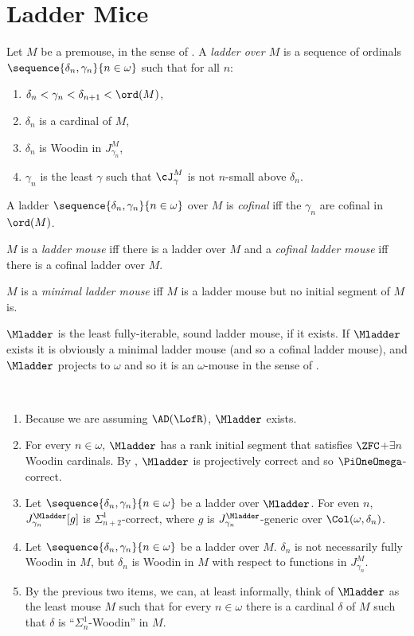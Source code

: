 \documentclass[oneside,12pt]{amsart}
\begin{document}
\section{Ladder Mice}
\label{section:laddermice}
\begin{definition}
Let $M$ be a premouse, in the sense of \cite{FSIT}. A \emph{ladder over $M$}
is a sequence of ordinals $\sequence{\delta_n,\gamma_n}{n\in\omega}$ such that
for all $n$:
\begin{enumerate}
\item $\delta_n < \gamma_n < \delta_{n+1} < \ord(M)$,
\item $\delta_n$ is a cardinal of $M$,
\item $\delta_n$ is Woodin in $J^M_{\gamma_n}$,
\item $\gamma_n$ is the least $\gamma$ such that $\cJ^M_{\gamma}$ is not $n$-small above $\delta_n$.
\end{enumerate}

A ladder $\sequence{\delta_n,\gamma_n}{n\in\omega}$ over $M$ is \emph{cofinal}
iff the $\gamma_n$ are cofinal in $\ord(M)$.

$M$ is a \emph{ladder mouse} iff there is a ladder over $M$ and a
\emph{cofinal ladder mouse} iff there is a cofinal ladder over $M$.

$M$ is a \emph{minimal ladder mouse} iff $M$ is a ladder mouse but no initial
segment of $M$ is.

$\Mladder$ is the least fully-iterable, sound ladder mouse, if it exists. If
$\Mladder$ exists it is obviously a minimal ladder mouse (and so a cofinal
ladder mouse), and $\Mladder$ projects to $\omega$ and so it is an $\omega$-mouse
in the sense of \cite{Proj_WO_In_Mod}.
\end{definition}

\begin{remarks} \
\begin{enumerate}
\item Because we are assuming $\AD(\LofR)$, $\Mladder$ exists.
\item For every $n\in\omega$, $\Mladder$ has a rank initial segment that satisfies
$\ZFC$+$\exists n$ Woodin cardinals.  By \cite{Proj_WO_In_Mod}, $\Mladder$ is projectively correct and so $\PiOneOmega$-correct.
\item Let $\sequence{\delta_n,\gamma_n}{n\in\omega}$ be a ladder over $\Mladder$.
For even $n$, $J^{\Mladder}_{\gamma_n}[g]$ is $\Sigma^1_{n+2}$-correct,
where $g$ is $J^{\Mladder}_{\gamma_n}$-generic over $\Col(\omega,\delta_n)$.
\item Let $\sequence{\delta_n,\gamma_n}{n\in\omega}$ be a ladder over $M$.
$\delta_n$ is not necessarily fully Woodin in $M$, but $\delta_n$ is Woodin in $M$
with respect to functions in $J^M_{\gamma_n}$.
\item By the previous two items, we can, at least informally, think of
$\Mladder$ as the least mouse
$M$ such that for every $n\in\omega$ there is a cardinal $\delta$ of $M$ such
that $\delta$ is ``$\Sigma^1_n$-Woodin'' in $M$.
\end{enumerate}
\end{remarks}
\end{document}
